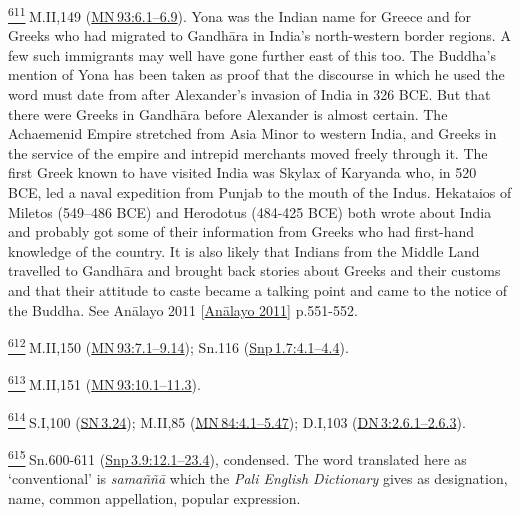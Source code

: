 \label{footprints_split_025.html_fn611}
\hyperref[footprints_split_015.htmlux5cux23fnref611]{\textsuperscript{611}} M.II,149
(\href{https://suttacentral.net/mn93/en/sujato\#6.1}{MN\,93:6.1--6.9}).
Yona was the Indian name for Greece and for Greeks who had migrated to
Gandhāra in India's north-western border regions. A few such immigrants
may well have gone further east of this too. The Buddha's mention of
Yona has been taken as proof that the discourse in which he used the
word must date from after Alexander's invasion of India in 326 BCE. But
that there were Greeks in Gandhāra before Alexander is almost certain.
The Achaemenid Empire stretched from Asia Minor to western India, and
Greeks in the service of the empire and intrepid merchants moved freely
through it. The first Greek known to have visited India was Skylax of
Karyanda who, in 520 BCE, led a naval expedition from Punjab to the
mouth of the Indus. Hekataios of Miletos (549--486 BCE) and Herodotus
(484-425 BCE) both wrote about India and probably got some of their
information from Greeks who had first-hand knowledge of the country. It
is also likely that Indians from the Middle Land travelled to Gandhāra
and brought back stories about Greeks and their customs and that their
attitude to caste became a talking point and came to the notice of the
Buddha. See {Anālayo 2011
{{[}\hyperref[footprints_split_022.htmlux5cux23Anux101layoux5cux25202011]{Anālayo
2011}{]}}} p.551-552.

\label{footprints_split_025.html_fn612}
\hyperref[footprints_split_015.htmlux5cux23fnref612]{\textsuperscript{612}} M.II,150
(\href{https://suttacentral.net/mn93/en/sujato\#7.1}{MN\,93:7.1--9.14});
Sn.116
(\href{https://suttacentral.net/snp1.7/en/sujato\#4.1}{Snp\,1.7:4.1--4.4}).

\label{footprints_split_025.html_fn613}
\hyperref[footprints_split_015.htmlux5cux23fnref613]{\textsuperscript{613}} M.II,151
(\href{https://suttacentral.net/mn93/en/sujato\#10.1}{MN\,93:10.1--11.3}).

\label{footprints_split_025.html_fn614}
\hyperref[footprints_split_015.htmlux5cux23fnref614]{\textsuperscript{614}} S.I,100
(\href{https://suttacentral.net/sn3.24/en/sujato}{SN\,3.24}); M.II,85
(\href{https://suttacentral.net/mn84/en/sujato\#4.1}{MN\,84:4.1--5.47});
D.I,103
(\href{https://suttacentral.net/dn3/en/sujato\#2.6.1}{DN\,3:2.6.1--2.6.3}).

\label{footprints_split_025.html_fn615}
\hyperref[footprints_split_015.htmlux5cux23fnref615]{\textsuperscript{615}} Sn.600-611
(\href{https://suttacentral.net/snp3.9/en/sujato\#12.1}{Snp\,3.9:12.1--23.4}),
condensed. The word translated here as `conventional' is \emph{samaññā}
which the \emph{Pali English Dictionary} gives as designation, name,
common appellation, popular expression.

